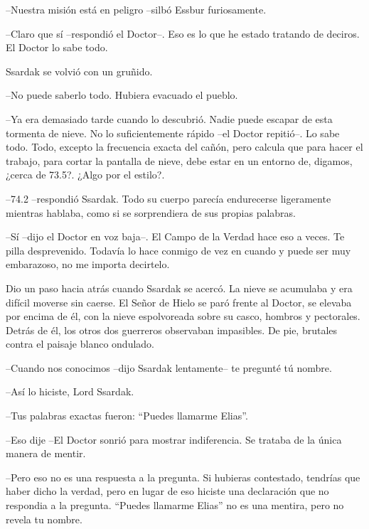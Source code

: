 --Nuestra misión está en peligro --silbó Essbur furiosamente.



--Claro que sí --respondió el Doctor--. Eso es lo que he estado tratando de deciros. El Doctor lo sabe todo.



Ssardak se volvió con un gruñido. 


--No puede saberlo todo. Hubiera evacuado el pueblo.



--Ya era demasiado tarde cuando lo descubrió. Nadie puede escapar de esta tormenta de nieve. No lo suficientemente rápido --el Doctor repitió--. Lo sabe todo. Todo, excepto la frecuencia exacta del cañón, pero calcula que para hacer el trabajo, para cortar la pantalla de nieve, debe estar en un entorno de, digamos, ¿cerca de 73.5?. ¿Algo por el estilo?.



--74.2 --respondió Ssardak. Todo su cuerpo parecía endurecerse ligeramente mientras hablaba, como si se sorprendiera de sus propias palabras.



--Sí --dijo el Doctor en voz baja--. El Campo de la Verdad hace eso a veces. Te pilla desprevenido. Todavía lo hace conmigo de vez en cuando y puede ser muy embarazoso, no me importa decirtelo.



Dio un paso hacia atrás cuando Ssardak se acercó. La nieve se acumulaba y era difícil moverse sin caerse. El Señor de Hielo se paró frente al Doctor, se elevaba por encima de él, con la nieve espolvoreada sobre su casco, hombros y pectorales. Detrás de él, los otros dos guerreros observaban impasibles. De pie, brutales contra el paisaje blanco ondulado.



--Cuando nos conocimos --dijo Ssardak lentamente-- te pregunté tú nombre. 



--Así lo hiciste, Lord Ssardak.



--Tus palabras exactas fueron: ``Puedes llamarme Elias''.



--Eso dije --El Doctor sonrió para mostrar indiferencia. Se trataba de la única manera de mentir.



--Pero eso no es una respuesta a la pregunta. Si hubieras contestado, tendrías que haber dicho la verdad, pero en lugar de eso hiciste una declaración que no respondia a la pregunta. ``Puedes llamarme Elias'' no es una mentira, pero no revela tu nombre.




